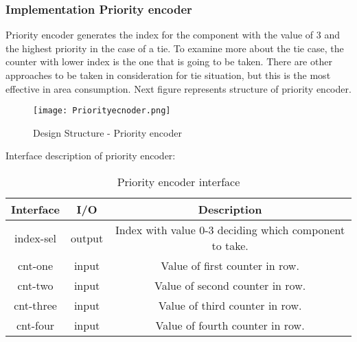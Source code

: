 \documentclass{scrreprt}
\begin{document}
\subsubsection*{Implementation Priority encoder}
Priority encoder generates the index for the component with the value of 3 and the highest priority in the case of a tie. To examine more about the tie case, the counter with lower index is the one that is going to be taken. There are other approaches to be taken in consideration for tie situation, but this is the most effective in area consumption. Next figure represents structure of priority encoder. 
\begin{figure}[ht]
    \centering
    \texttt{[image: Priorityecnoder.png]}
    \caption{Design Structure - Priority encoder}
    \label{fig:Pe}
\end{figure}
\newline
\newline
\newline
\newline
\newline
\newline
Interface description of priority encoder: 
\begin{table}[htb!]
            \centering
            \begin{tabular}{|c|c|c|} \hline 
             Interface & I/O & Description \\ \hline  
             index-sel & output & Index with value 0-3 deciding which component to take. \\ \hline  
             cnt-one & input & Value of first counter in row.  \\ \hline
             cnt-two & input & Value of second counter in row. \\ \hline
             cnt-three & input & Value of third counter in row. \\ \hline
             cnt-four & input & Value of fourth counter in row. \\ \hline
        \end{tabular}
        \caption{Priority encoder interface}
        \label{tab:PeI}
    \end{table}
\end{document}
